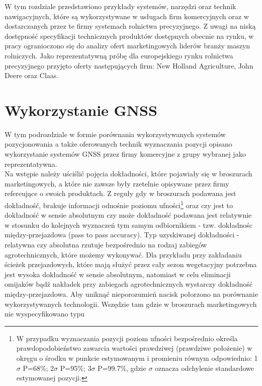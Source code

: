 W tym rozdziale przedstawiono przykłady systemów, narzędzi oraz technik nawigacyjnych, które są wykorzystywane w usługach firm komercyjnych 
oraz w dostarczanych przez te firmy systemach rolnictwa precyzyjnego. Z uwagi na niską dostępność specyfikacji technicznych produktów 
dostępnych obecnie na rynku, w pracy ogranioczono się do analizy ofert marketingowych liderów branży maszyn rolniczych.
Jako reprezentatywną próbę dla europejskiego rynku rolnictwa precyzyjnego przyjęto oferty następujących firm: New Holland Agriculture,
John Deere oraz Claas.
\section{Wykorzystanie GNSS}
W tym podrozdziale w formie porównania wykorzystywanych systemów pozycjonowania a także oferowanych technik wyznaczania pozycji opisano wykorzystanie 
systemów GNSS przez firmy komercyjne z grupy wybranej jako reprezentatywna.\\
\indent Na wstępie należy uściślić pojęcia dokładności, które pojawiały się w broszurach marketingowych, a które nie zawsze były rzetelnie opisywane 
przez firmy refereujące o swoich produktach. Z reguły gdy w broszurach podawana jest dokładność, brakuje informacji odnośnie poziomu ufności\footnote{
W przypadku wyznaczania pozycji poziom ufności bezpośrednio określa prawdopodobieństwo zawarcia wartości prawdziwej (prawdziwe położenie) w okręgu o środku w punkcie 
estymowanym i promieniu równym odpowiednio: 1$\sigma$ P=68\%; 2$\sigma$ P=95\%; 3$\sigma$ P=99.7\%, gdzie $\sigma$ oznacza odchylenie standardowe estymowanej pozycji.}
oraz czy jest to dokładność w sensie absolutnym czy może dokładność podawana jest relatywnie w stosunku do kolejnych wyznaczeń tym samym odbiornikiem - tzw.
dokładnośc między-przejazdowa (pass to pass accuracy). Typ uzyskiwanej dokładności - relatywna czy absolutna rzutuje bezpośrednio na rodzaj zabiegów 
agrotechnicznych, które możemy wykonywać. Dla przykładu przy zakładaniu ścieżek przejazdowych, które mają służyć przez cały sezon wegetacyjny potrzebna 
jest wysoka dokładność w sensie absolutnym, natomiast w celu eliminacji omijaków bądź nakładek przy zabiegach agrotechnicznych wystarczy dokładność między-przejazdowa.
Aby uniknąć nieporozumień nacisk połorzono na porównanie wykorzystywanych technologii. Wszędzie tam gdzie w broszurach marketingowych nie wyspecyfikowano typu 
